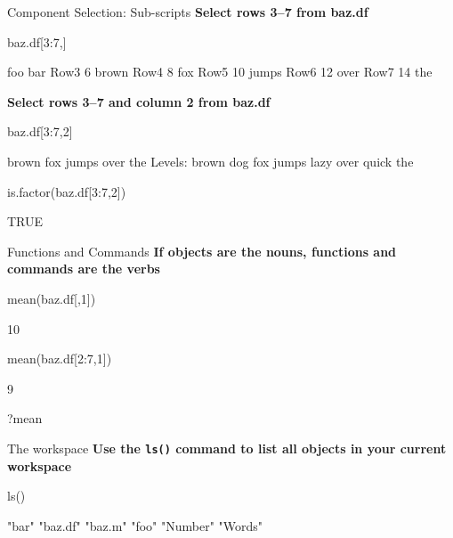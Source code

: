 \documentclass{beamer}\usepackage[]{graphicx}\usepackage[]{color}
\begin{document}
\begin{frame}[fragile]{Component Selection: Sub-scripts}
  \textbf{Select rows 3--7 from baz.df}
\begin{Schunk}
\begin{Sinput}
baz.df[3:7,]
\end{Sinput}
\begin{Soutput}
     foo   bar
Row3   6 brown
Row4   8   fox
Row5  10 jumps
Row6  12  over
Row7  14   the
\end{Soutput}
\end{Schunk}
\textbf{Select rows 3--7 and column 2 from baz.df}
\begin{Schunk}
\begin{Sinput}
baz.df[3:7,2]
\end{Sinput}
\begin{Soutput}
[1] brown fox   jumps over  the  
Levels: brown dog fox jumps lazy over quick the
\end{Soutput}
\begin{Sinput}
 is.factor(baz.df[3:7,2])
\end{Sinput}
\begin{Soutput}
[1] TRUE
\end{Soutput}
\end{Schunk}
\end{frame}


\begin{frame}[fragile]{Functions and Commands}
   \textbf{If objects are the nouns, functions and commands are the verbs}
\begin{Schunk}
\begin{Sinput}
mean(baz.df[,1])
\end{Sinput}
\begin{Soutput}
[1] 10
\end{Soutput}
\begin{Sinput}
mean(baz.df[2:7,1])
\end{Sinput}
\begin{Soutput}
[1] 9
\end{Soutput}
\begin{Sinput}
?mean
\end{Sinput}
\end{Schunk}
\end{frame}

\begin{frame}[fragile]{The workspace}
   \textbf{Use the \texttt{ls()} command to list all objects in your
     current workspace}
\begin{Schunk}
\begin{Sinput}
ls()
\end{Sinput}
\begin{Soutput}
[1] "bar"    "baz.df" "baz.m"  "foo"    "Number" "Words" 
\end{Soutput}
\end{Schunk}
\end{frame}
\end{document}
